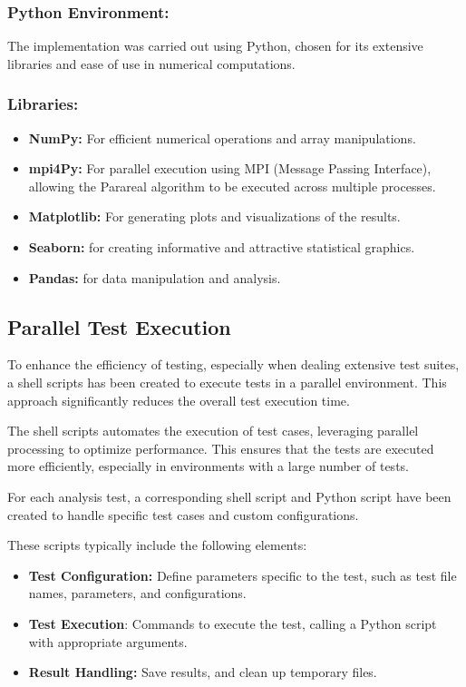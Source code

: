\documentclass[a4paper,12pt,french]{article}
\begin{document}
\subsubsection{Python Environment:}
The implementation was carried out using Python, chosen for its extensive libraries and ease of use in numerical computations.
\subsubsection{Libraries:}
\begin{itemize}
    \item \textbf{NumPy:} For efficient numerical operations and array manipulations.
    \item \textbf{mpi4Py:} For parallel execution using MPI (Message Passing Interface), allowing the Parareal algorithm to be executed across multiple processes.
    \item \textbf{Matplotlib:} For generating plots and visualizations of the results.
    \item \textbf{Seaborn:} for creating informative and attractive statistical graphics.
    \item \textbf{Pandas:} for data manipulation and analysis.
\end{itemize}
\subsection{Parallel Test Execution}
To enhance the efficiency of testing, especially when dealing extensive test suites, a shell scripts has been created to execute tests in a parallel environment. This approach significantly reduces the overall test execution time.

The shell scripts automates the execution of test cases, leveraging parallel processing to optimize performance. This ensures that the tests are executed more efficiently, especially in environments with a large number of tests.

For each analysis test, a corresponding shell script and Python script have been created to handle specific test cases and custom configurations. 

These scripts typically include the following elements:
\begin{itemize}
    \item \textbf{Test Configuration:} Define parameters specific to the test, such as test file names, parameters, and configurations.
    \item \textbf{Test Execution}: Commands to execute the test, calling a Python script with appropriate arguments.
    \item \textbf{Result Handling:} Save results, and clean up temporary files.
\end{itemize}
\end{document}
